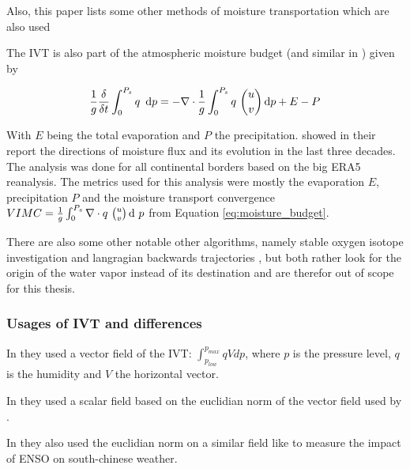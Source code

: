 Also, this paper lists some other methods of moisture transportation which are also used

The IVT is also part of the atmospheric moisture budget \cite{yang_moisture_2022} (and similar in \cite{seager_mechanisms_2020}) given by 

$$
\label{eq:moisture_budget}
\frac{1}{g} \frac{\delta}{\delta t} \int^{P_s}_0 q ~ \operatorname{d}\!{p} = - \nabla \cdot \frac{1}{g} \int^{P_s}_0 q ~\binom{u}{v} \operatorname{d}\!{p} + E - P
$$

With $E$ being the total evaporation and $P$ the precipitation. 
\citeauthor{yang_moisture_2022} showed in their report \cite{yang_moisture_2022} the directions of moisture flux and its evolution in the last three decades. The analysis was done for all continental borders based on the big ERA5 reanalysis.
The metrics used for this analysis were mostly the evaporation $E$, precipitation $P$ and the moisture transport convergence  $VIMC = \frac{1}{g} \int^{P_s}_0  \nabla \cdot q ~\binom{u}{v} \operatorname{d}\!{~} p$ from Equation \ref{eq:moisture_budget}.


There are also some other notable other algorithms, namely stable oxygen isotope investigation \cite{ma_atmospheric_nodate} and langragian backwards trajectories \cite{zhao_lagrangian_2021}, but both rather look for the origin of the  water vapor instead of its destination and are therefor out of scope for this thesis.

\subsubsection{Usages of IVT and differences}

In \cite{ralph_dropsonde_2017} they used a vector field of the IVT: $\int_{p_{low}}^{p_{max}} qV dp$, where $p$ is the pressure level, $q$ is the humidity and $V$ the horizontal vector.

In \cite{sousa_north_2020} they used a scalar field based on the euclidian norm of the vector field used by \cite{ralph_dropsonde_2017}.


In \cite{ayantobo_integrated_2022} they also used the euclidian norm on a similar field like \cite{ralph_dropsonde_2017} to measure the impact of  ENSO on south-chinese weather.

